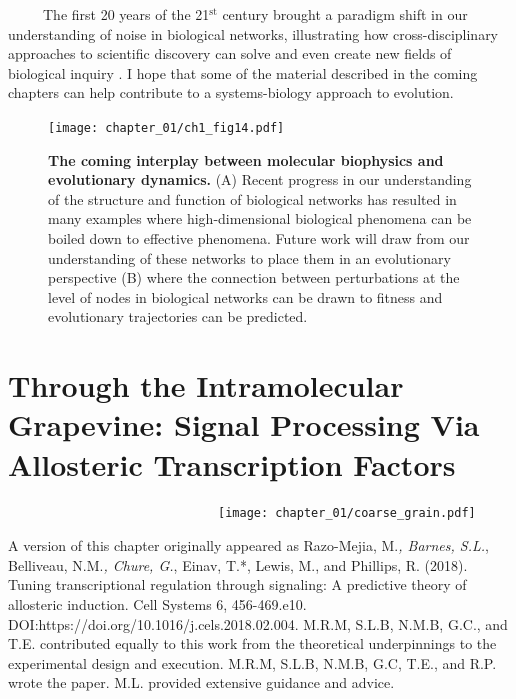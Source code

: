 \documentclass[12pt]{caltech_thesis}
\begin{document}
~~~~~The first 20 years of the 21\(^\text{st}\) century brought a
paradigm shift in our understanding of noise in biological networks,
illustrating how cross-disciplinary approaches to scientific discovery
can solve and even create new fields of biological inquiry
\autocite{ciechonska2016,eldar2010b}. I hope that some of the material
described in the coming chapters can help contribute to a
systems-biology approach to evolution.

\hypertarget{fig:molbiophys_evoldynam}{%
\begin{figure}
\centering
\texttt{[image: chapter\_01/ch1\_fig14.pdf]}
\caption[{The coming interplay between molecular biophysics and
evolutionary dynamics.}]{\textbf{The coming interplay between molecular
biophysics and evolutionary dynamics.} (A) Recent progress in our
understanding of the structure and function of biological networks has
resulted in many examples where high-dimensional biological phenomena
can be boiled down to effective phenomena. Future work will draw from
our understanding of these networks to place them in an evolutionary
perspective (B) where the connection between perturbations at the level
of nodes in biological networks can be drawn to fitness and evolutionary
trajectories can be predicted.}
\label{fig:molbiophys_evoldynam}
\end{figure}
}

\hypertarget{through-the-intramolecular-grapevine-signal-processing-via-allosteric-transcription-factors}{%
\chapter{Through the Intramolecular Grapevine: Signal Processing Via
Allosteric Transcription
Factors}\label{through-the-intramolecular-grapevine-signal-processing-via-allosteric-transcription-factors}}

~~~~~~~~~~~~~~~~~~~~~~~~~~~~~~\texttt{[image: chapter\_01/coarse\_grain.pdf]}

A version of this chapter originally appeared as Razo-Mejia, M.\emph{,
Barnes, S.L.}, Belliveau, N.M.\emph{, Chure, G.}, Einav, T.*, Lewis, M.,
and Phillips, R. (2018). Tuning transcriptional regulation through
signaling: A predictive theory of allosteric induction. Cell Systems 6,
456-469.e10. DOI:https://doi.org/10.1016/j.cels.2018.02.004. M.R.M,
S.L.B, N.M.B, G.C., and T.E. contributed equally to this work from the
theoretical underpinnings to the experimental design and execution.
M.R.M, S.L.B, N.M.B, G.C, T.E., and R.P. wrote the paper. M.L. provided
extensive guidance and advice.
\end{document}
